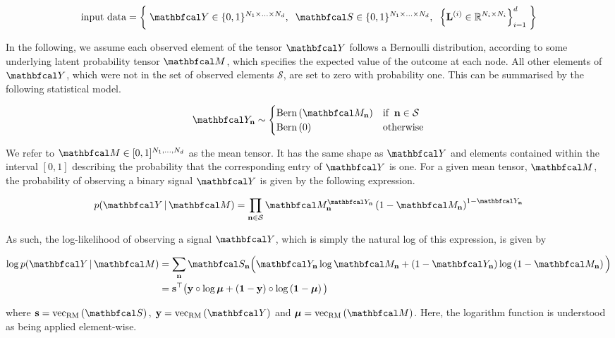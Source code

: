 \begin{equation*}
    \text{input data} = \left\{\; \Yt \in \{0, 1\}^{N_1 \times ... \times N_d}, \;\; \St \in \{0, 1\}^{N_1 \times ... \times N_d} , \;\; \left\{\LL^{(i)} \in \R^{N_i \times N_i}\right\}_{i=1}^d \; \right\}
\end{equation*}

In the following, we assume each observed element of the tensor $\Yt$ follows a Bernoulli distribution, according to some underlying latent probability tensor $\Mt$, which specifies the expected value of the outcome at each node. All other elements of $\Yt$, which were not in the set of observed elements $\mathcal{S}$, are set to zero with probability one. This can be summarised by the following statistical model. 

\begin{equation}    
    \Yt_\nn \sim  \begin{cases}
        \text{Bern}\left(\Mt_\nn \right) & \text{if} \;\; \nn \in \mathcal{S} \\
        \text{Bern}\left(0\right) & \text{otherwise}
    \end{cases}
\end{equation}


We refer to $\Mt \in [0, 1]^{N_1, ..., N_d}$ as the mean tensor. It has the same shape as $\Yt$ and elements contained within the interval $[0, 1]$ describing the probability that the corresponding entry of $\Yt$ is one. For a given mean tensor, $\Mt$, the probability of observing a binary signal $\Yt$ is given by the following expression. 

\begin{equation}
    p(\Yt \, | \, \Mt) = \prod_{\nn \in \mathcal{S}} \Mt_\nn^{\Yt_\nn}\left(1 - \Mt_\nn\right)^{1 - \Yt_\nn}
\end{equation}

As such, the log-likelihood of observing a signal $\Yt$, which is simply the natural log of this expression, is given by 

\begin{align}
   \log p(\Yt \, | \, \Mt) &= \sum_{\nn} \St_{\nn} \Big( \Yt_{\nn} \log \Mt_{\nn} + (1 - \Yt_{\nn}) \log \left(1 - \Mt_{\nn}\right) \Big) \notag \\
   &= \s^\top \big(\y \circ \log \muu + \left(\one  - \y\right) \circ \log \left(\one - \muu \right)\big) 
\end{align}

where $\s = \vecrm{\St}, \; \y = \vecrm{\Yt}$ and $\muu = \vecrm{\Mt}$. Here, the logarithm function is understood as being applied element-wise.

